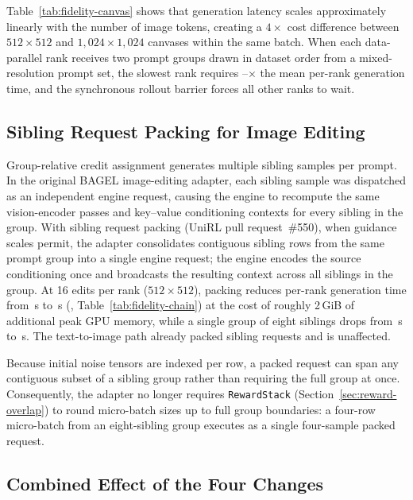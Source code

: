 Table~\ref{tab:fidelity-canvas} shows that generation latency scales approximately linearly with the number of image tokens, creating a $4\times$ cost difference between $512\times512$ and $1{,}024\times1{,}024$ canvases within the same batch.
When each data-parallel rank receives two prompt groups drawn in dataset order from a mixed-resolution prompt set, the slowest rank requires \RFTailMin{}--\RFTailMax{}$\times$ the mean per-rank generation time, and the synchronous rollout barrier forces all other ranks to wait.

\subsection{Sibling Request Packing for Image Editing}
\label{sec:fidelity-pack}

Group-relative credit assignment generates multiple sibling samples per prompt.
In the original BAGEL image-editing adapter, each sibling sample was dispatched as an independent engine request, causing the engine to recompute the same vision-encoder passes and key--value conditioning contexts for every sibling in the group.
With sibling request packing (UniRL pull request~\#550), when guidance scales permit, the adapter consolidates contiguous sibling rows from the same prompt group into a single engine request; the engine encodes the source conditioning once and broadcasts the resulting context across all siblings in the group.
At 16 edits per rank ($512\times512$), packing reduces per-rank generation time from \RFCanvasGenerate{}\,s to \RFPackGenerate{}\,s (\RFPackSaving{}, Table~\ref{tab:fidelity-chain}) at the cost of roughly 2\,GiB of additional peak GPU memory, while a single group of eight siblings drops from \RFUnpackedGroupEight{}\,s to \RFPackedGroupEight{}\,s.
The text-to-image path already packed sibling requests and is unaffected.

Because initial noise tensors are indexed per row, a packed request can span any contiguous subset of a sibling group rather than requiring the full group at once.
Consequently, the adapter no longer requires \texttt{RewardStack} (Section~\ref{sec:reward-overlap}) to round micro-batch sizes up to full group boundaries: a four-row micro-batch from an eight-sibling group executes as a single four-sample packed request.

\subsection{Combined Effect of the Four Changes}
\label{sec:fidelity-combined}

